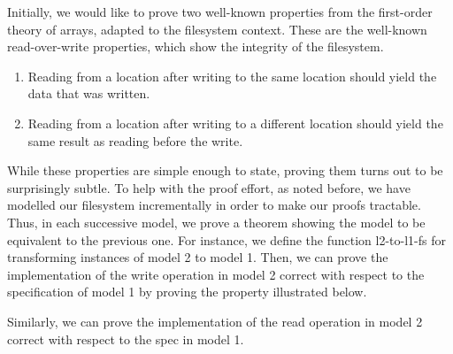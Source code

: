 \documentclass[format=sigconf,review=true]{acmart}
\begin{document}
Initially, we would like to prove two well-known properties from the
first-order theory of arrays, adapted to the filesystem context. These
are the well-known read-over-write properties, which show the
integrity of the filesystem.

\begin {enumerate}
\item Reading from a location after writing to the same location
  should yield the data that was written.
\item Reading from a location after writing to a different
  location should yield the same result as reading before the write.
\end {enumerate}

While these properties are simple enough to state, proving them turns
out to be surprisingly subtle. To help with the proof effort, as noted
before, we have modelled our filesystem incrementally in order to make
our proofs tractable. Thus, in each successive model, we prove a
theorem showing the model to be equivalent to the previous one.
For instance, we define the function l2-to-l1-fs for transforming
instances of model 2 to model 1. Then, we can prove the implementation
of the write operation in model 2 correct with respect to the
specification of model 1 by proving the property illustrated below.


Similarly, we can prove the implementation of the read operation in
model 2 correct with respect to the spec in model 1.

\end{document}
